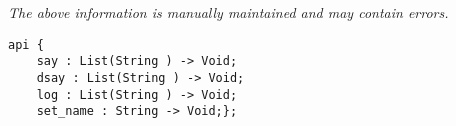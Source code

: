 \label{api:Say}

{\tiny \it The above information is manually maintained and may contain errors.}
\begin{verbatim}
api {
    say : List(String ) -> Void;
    dsay : List(String ) -> Void;
    log : List(String ) -> Void;
    set_name : String -> Void;};
\end{verbatim}
